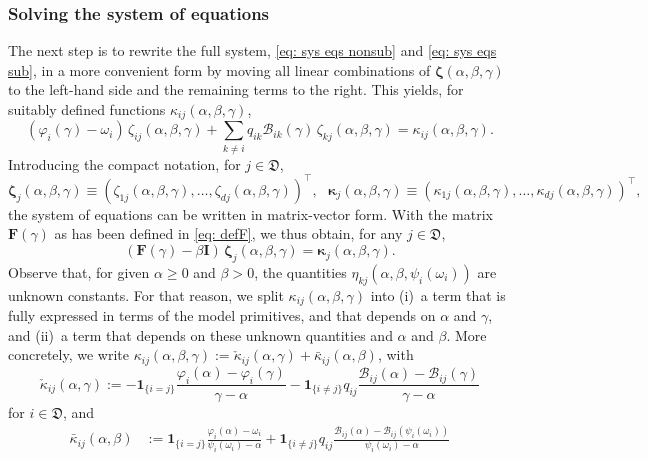 \documentclass[reqno,12pt]{amsart}
\newcommand{\bs}{\boldsymbol}
\newcommand{\defD}{{\mathfrak D}}
\begin{document}
{\subsubsection*{Solving the system of equations}
The next step is to rewrite the full system, \eqref{eq: sys eqs nonsub} and \eqref{eq: sys eqs sub}, in a more convenient form by moving all linear combinations of $\bs\zeta(\alpha,\beta,\gamma)$ to the left-hand side and the remaining terms to the right. This yields, for suitably defined functions $\kappa_{ij}(\alpha, \beta, \gamma)$,
\begin{equation*}
    (\varphi_i(\gamma) - \omega_i)\,\zeta_{ij}(\alpha,\beta,\gamma) + \sum_{k\neq i} q_{ik} \mathscr{B}_{ik}(\gamma)\,\zeta_{kj}(\alpha, \beta, \gamma) = \kappa_{ij}(\alpha, \beta, \gamma).
\end{equation*}
Introducing the compact notation, for $j\in\defD $,
\[{\bs \zeta}_j(\alpha,\beta,\gamma)\equiv (\zeta_{1j}(\alpha,\beta,\gamma),\ldots,\zeta_{dj}(\alpha,\beta,\gamma))^\top,\:\:\: {\bs \kappa}_j(\alpha,\beta,\gamma)\equiv (\kappa_{1j}(\alpha,\beta,\gamma),\ldots,\kappa_{dj}(\alpha,\beta,\gamma))^\top,\]
the system of equations can be written in matrix-vector form. With the matrix  $\bs F(\gamma)$ as has been defined in \eqref{eq: defF}, we thus obtain, for any $j\in\defD $,
\begin{equation}
    (\bs{F}(\gamma)-\beta\bs{I})\,{\bs \zeta}_j(\alpha,\beta,\gamma) = {\bs \kappa}_j(\alpha,\beta,\gamma).
\end{equation}
Observe that, for given $\alpha\geqslant 0$ and $\beta>0$, the quantities $\eta_{kj}(\alpha,\beta,\psi_i(\omega_i))$ are unknown constants. For that reason, we split $\kappa_{ij}(\alpha,\beta,\gamma)$ into (i)~a term that is fully expressed in terms of the model primitives, and that depends on $\alpha$ and $\gamma$, and (ii)~a term that depends on these unknown quantities and $\alpha$ and $\beta$.
More concretely, we write 
$\kappa_{ij}(\alpha,\beta,\gamma):= \check \kappa_{ij}(\alpha,\gamma)+\bar \kappa_{ij}(\alpha,\beta)$, with
\begin{equation*}
    \check \kappa_{ij}(\alpha,\gamma):= - {\bs 1}_{\{i = j\}} \frac{\varphi_i(\alpha) - \varphi_i(\gamma)}{\gamma - \alpha} -{\bs 1}_{\{i\neq j\}} q_{ij} \frac{\mathscr{B}_{ij}(\alpha) - \mathscr{B}_{ij}(\gamma)}{\gamma - \alpha}
\end{equation*}
for $i\in\defD $, and
\begin{align*}
    \bar \kappa_{ij}(\alpha,\beta) &:= {\bs 1}_{\{i = j\}}\frac{\varphi_i(\alpha) - \omega_i}{\psi_i(\omega_i) - \alpha} + {\bs 1}_{\{i \neq j\}}q_{ij}\frac{\mathscr{B}_{ij}(\alpha) - \mathscr{B}_{ij}(\psi_i(\omega_i))}{\psi_i(\omega_i) - \alpha}\\

\end{align*}}
\end{document}
